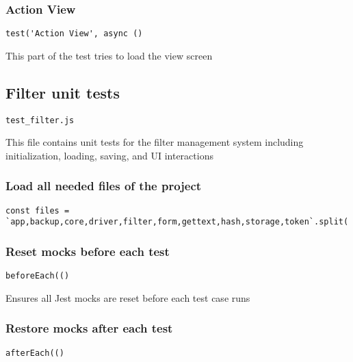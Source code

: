 \documentclass[a4paper]{article}
\begin{document}
\hypertarget{toc580}{}
\subsubsection{Action View}

\begin{lstlisting}
test('Action View', async ()
\end{lstlisting}

This part of the test tries to load the view screen

\hypertarget{toc581}{}
\subsection{Filter unit tests}

\begin{lstlisting}
test_filter.js
\end{lstlisting}

This file contains unit tests for the filter management system
including initialization, loading, saving, and UI interactions

\hypertarget{toc582}{}
\subsubsection{Load all needed files of the project}

\begin{lstlisting}
const files = `app,backup,core,driver,filter,form,gettext,hash,storage,token`.split(',');
\end{lstlisting}

\hypertarget{toc583}{}
\subsubsection{Reset mocks before each test}

\begin{lstlisting}
beforeEach(()
\end{lstlisting}

Ensures all Jest mocks are reset before each test case runs

\hypertarget{toc584}{}
\subsubsection{Restore mocks after each test}

\begin{lstlisting}
afterEach(()
\end{lstlisting}
\end{document}
